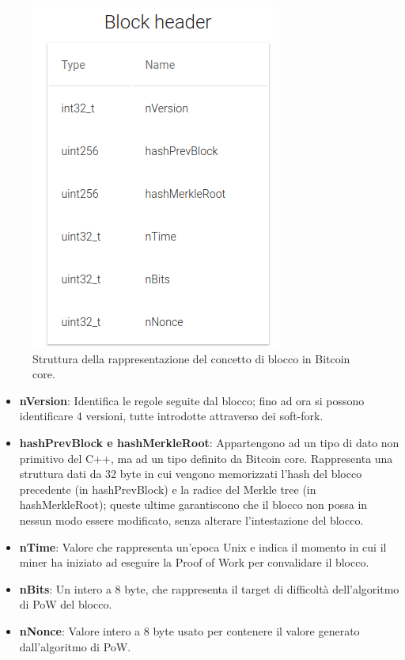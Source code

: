 \begin{figure}[h]
\begin{center}
\includegraphics[width=0.8\columnwidth]{images/bitcoinstructs/blockheader.png}
\end{center}
\caption{Struttura della rappresentazione del concetto di blocco in Bitcoin core.}
\label{fig:blockheaderbitcoinc}
\end{figure}

\begin{itemize}
  \item {\bf nVersion\/}: Identifica le regole seguite dal blocco; fino ad ora si possono identificare 4 versioni, tutte introdotte attraverso dei soft-fork.
  \item {\bf hashPrevBlock e hashMerkleRoot\/}: Appartengono ad un tipo di dato non primitivo del C++, ma ad un tipo definito da Bitcoin core. Rappresenta una struttura dati da 32 byte in cui vengono memorizzati l’hash del blocco precedente (in hashPrevBlock) e la radice del Merkle tree (in hashMerkleRoot); queste ultime garantiscono che il blocco non possa in nessun modo essere modificato, senza alterare l’intestazione del blocco.
  \item {\bf nTime\/}: Valore che rappresenta un’epoca Unix e indica il momento in cui il miner ha iniziato ad eseguire la Proof of Work per convalidare il blocco.
  \item {\bf nBits\/}: Un intero a 8 byte, che rappresenta il target di difficoltà dell’algoritmo di PoW del blocco.
  \item {\bf nNonce\/}: Valore intero a 8 byte usato per contenere il valore generato dall’algoritmo di PoW.
\end{itemize}


